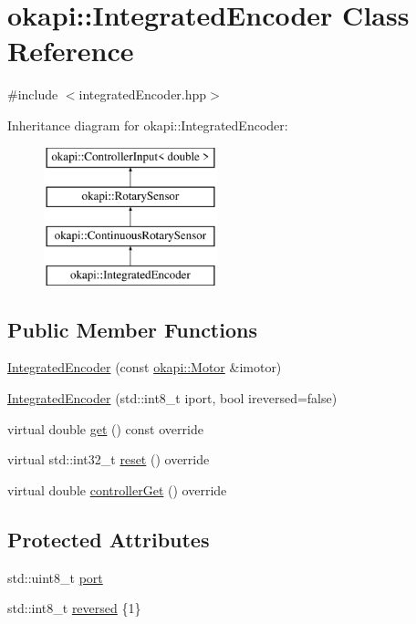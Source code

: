 \hypertarget{classokapi_1_1IntegratedEncoder}{}\section{okapi\+::Integrated\+Encoder Class Reference}
\label{classokapi_1_1IntegratedEncoder}


{\ttfamily \#include $<$integrated\+Encoder.\+hpp$>$}

Inheritance diagram for okapi\+::Integrated\+Encoder\+:\begin{figure}[H]
\begin{center}
\leavevmode
\includegraphics[height=4.000000cm]{classokapi_1_1IntegratedEncoder}
\end{center}
\end{figure}
\subsection*{Public Member Functions}
\begin{DoxyCompactItemize}
\item 
\mbox{\hyperlink{classokapi_1_1IntegratedEncoder_a05d0256b51e3631d9ee9177c4eafcb99}{Integrated\+Encoder}} (const \mbox{\hyperlink{classokapi_1_1Motor}{okapi\+::\+Motor}} \&imotor)
\item 
\mbox{\hyperlink{classokapi_1_1IntegratedEncoder_a8bf2f0ca1b334f23b4aab5afe58cc578}{Integrated\+Encoder}} (std\+::int8\+\_\+t iport, bool ireversed=false)
\item 
virtual double \mbox{\hyperlink{classokapi_1_1IntegratedEncoder_af3fe091ddf4b7f36443a5616bfedc3cb}{get}} () const override
\item 
virtual std\+::int32\+\_\+t \mbox{\hyperlink{classokapi_1_1IntegratedEncoder_a1f95f00f59911a87a9a38633343f4311}{reset}} () override
\item 
virtual double \mbox{\hyperlink{classokapi_1_1IntegratedEncoder_a5898ddc979b9cf2bcee0da3d440f28f8}{controller\+Get}} () override
\end{DoxyCompactItemize}
\subsection*{Protected Attributes}
\begin{DoxyCompactItemize}
\item 
std\+::uint8\+\_\+t \mbox{\hyperlink{classokapi_1_1IntegratedEncoder_a1eb50864ff5509d1d11073325f2353fa}{port}}
\item 
std\+::int8\+\_\+t \mbox{\hyperlink{classokapi_1_1IntegratedEncoder_a7a354457ac0f976c9aab65c73070c0ee}{reversed}} \{1\}
\end{DoxyCompactItemize}


